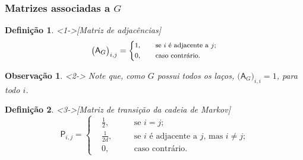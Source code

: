 \documentclass{beamer}
\def\matriz#1{\mathsf{#1}}
\theoremstyle{teoaxicorlem}
\theoremstyle{defnotnom}
\newtheorem{Def}{Definição}
\newtheorem{Obs}{Observação}
\begin{document}
\begin{frame}
  \frametitle{Matrizes associadas a $G$}
  \begin{Def}<1->[Matriz de adjacências]
    \begin{equation*}
      \footnotesize
      {\bigl({\matriz A}_G\bigr)}_{i,j} = \left\{
        \begin{aligned}
          &1, &\quad &\text{se $i$ é adjacente a $j$;}\\
          &0, &\quad &\text{caso contrário.}
        \end{aligned}
      \right.
    \end{equation*}
  \end{Def}
  \vfill
  \begin{Obs}<2->
    \footnotesize
    Note que, como $G$ possui todos os laços,
    ${\bigl({\matriz A}_G\bigr)}_{i,i}=1$, para todo $i$.
  \end{Obs}
  \vfill
  \begin{Def}<3->[Matriz de transição da cadeia de Markov]
    \footnotesize
    \begin{equation*}
      {\matriz P}_{i,j} = \left\{
        \begin{aligned}
          &\frac12, &\quad &\text{se $i=j$;}\\
          &\frac1{2d}, &\quad &\text{se $i$ é adjacente a $j$, mas
            $i\neq j$;}\\
          &0, &\quad &\text{caso contrário.}
        \end{aligned}
      \right.
    \end{equation*}
  \end{Def}
\end{frame}
\end{document}
